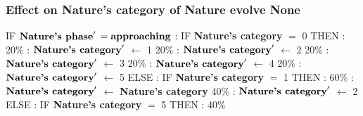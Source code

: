 \documentclass{article}%
\begin{document}
\subsubsection{Effect on Nature's category of Nature evolve None}%
\label{ssubsec:Effect on Nature's category of Nature evolve None}%
\begin{flushleft}%
IF %
$\mbox{\textbf{Nature's phase}} '$%
\linebreak%
\hspace*{2em}%
$= \mbox{\textbf{approaching}}$%
: %
IF %
\textbf{Nature's category}%
$=$%
0%
\linebreak%
\hspace*{4em}%
THEN %
: %
\linebreak%
\hspace*{6em}%
20\%%
: %
$\mbox{\textbf{Nature's category}} '$%
$\leftarrow$%
1%
\linebreak%
\hspace*{6em}%
20\%%
: %
$\mbox{\textbf{Nature's category}} '$%
$\leftarrow$%
2%
\linebreak%
\hspace*{6em}%
20\%%
: %
$\mbox{\textbf{Nature's category}} '$%
$\leftarrow$%
3%
\linebreak%
\hspace*{6em}%
20\%%
: %
$\mbox{\textbf{Nature's category}} '$%
$\leftarrow$%
4%
\linebreak%
\hspace*{6em}%
20\%%
: %
$\mbox{\textbf{Nature's category}} '$%
$\leftarrow$%
5%
\linebreak%
\hspace*{4em}%
ELSE %
: %
IF %
\textbf{Nature's category}%
$=$%
1%
\linebreak%
\hspace*{6em}%
THEN %
: %
\linebreak%
\hspace*{8em}%
60\%%
: %
$\mbox{\textbf{Nature's category}} '$%
$\leftarrow$%
\textbf{Nature's category}%
\linebreak%
\hspace*{8em}%
40\%%
: %
$\mbox{\textbf{Nature's category}} '$%
$\leftarrow$%
2%
\linebreak%
\hspace*{6em}%
ELSE %
: %
IF %
\textbf{Nature's category}%
$=$%
5%
\linebreak%
\hspace*{8em}%
THEN %
: %
\linebreak%
\hspace*{10em}%
40\%%

\end{flushleft}
\end{document}
